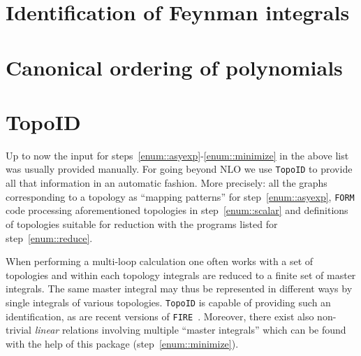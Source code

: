 \documentclass{article}
\begin{document}
\section{Identification of Feynman integrals}










\section{Canonical ordering of polynomials}

\section{TopoID}

Up to now the input for steps~\ref{enum::asyexp}-\ref{enum::minimize} in
the above list was usually provided manually.  For going beyond NLO we
use {\tt TopoID} to provide all that information in an automatic
fashion.  More precisely: all the graphs corresponding to a topology as
``mapping patterns'' for step~\ref{enum::asyexp}, {\tt FORM} code
processing aforementioned topologies in step~\ref{enum::scalar} and
definitions of topologies suitable for reduction with the programs
listed for step~\ref{enum::reduce}.

When performing a multi-loop calculation one often works with a set of
topologies and within each topology integrals are reduced to a finite
set of master integrals.  The same master integral may thus be
represented in different ways by single integrals of various topologies.
{\tt TopoID} is capable of providing such an identification, as are
recent versions of {\tt FIRE}~\cite{Smirnov:2013dia}.  Moreover, there
exist also non-trivial \emph{linear} relations involving multiple
``master integrals'' which can be found with the help of this package
(step~\ref{enum::minimize}).
\end{document}
